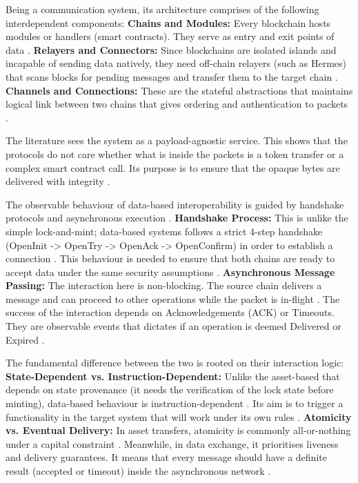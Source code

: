 Being a communication system, its architecture comprises of the
following interdependent components: \textbf{Chains and Modules:} Every
blockchain hosts modules or handlers (smart contracts). They serve as
entry and exit points of data \citep{Delgado_von_Eitzen_2025}
\citep{Chervinski_2023}. \textbf{Relayers and Connectors:} Since
blockchains are isolated islands and incapable of sending data natively,
they need off-chain relayers (such as Hermes) that scans blocks for
pending messages and transfer them to the target chain
\citep{Delgado_von_Eitzen_2025} \citep{Chervinski_2023}.
\textbf{Channels and Connections:} These are the stateful abstractions
that maintains logical link between two chains that gives ordering and
authentication to packets \citep{Bigiotti2025} \citep{wei2023formal}.

The literature sees the system as a payload-agnostic service. This shows
that the protocols do not care whether what is inside the packets is a
token transfer or a complex smart contract call. Its purpose is to
ensure that the opaque bytes are delivered with integrity
\citep{Kotey_2023} \citep{Delgado_von_Eitzen_2025}
\citep{Chervinski_2023} \citep{Bigiotti2025}.

The observable behaviour of data-based interoperability is guided by
handshake protocols and asynchronous execution \citep{lu2024atomicity}
\citep{Bigiotti2025} \citep{Wei_2023}. \textbf{Handshake Process:} This
is unlike the simple lock-and-mint; data-based systems follows a strict
4-step handshake (OpenInit -\textgreater{} OpenTry -\textgreater{}
OpenAck -\textgreater{} OpenConfirm) in order to establish a connection
\citep{Bigiotti2025} \citep{Wei_2023}. This behaviour is needed to
ensure that both chains are ready to accept data under the same security
assumptions \citep{Wei_2023}. \textbf{Asynchronous Message Passing:} The
interaction here is non-blocking. The source chain delivers a message
and can proceed to other operations while the packet is in-flight
\citep{lu2024atomicity} \citep{Bigiotti2025}. The success of the
interaction depends on Acknowledgements (ACK) or Timeouts. They are
observable events that dictates if an operation is deemed Delivered or
Expired \citep{Chervinski_2023} \citep{Wei_2023}.

The fundamental difference between the two is rooted on their
interaction logic: \textbf{State-Dependent vs. Instruction-Dependent:}
Unlike the asset-based that depends on state provenance (it needs the
verification of the lock state before minting), data-based behaviour is
instruction-dependent \citep{Wang_2022} \citep{deng2025}. Its aim is to
trigger a functionality in the target system that will work under its
own rules \citep{wang2021sok} \citep{Belchior_2021}. \textbf{Atomicity
vs. Eventual Delivery:} In asset transfers, atomicity is commonly
all-or-nothing under a capital constraint \citep{Pillai_2022}
\citep{Belchior_2023}. Meanwhile, in data exchange, it prioritises
liveness and delivery guarantees. It means that every message should
have a definite result (accepted or timeout) inside the asynchronous
network \citep{Bigiotti2025} \citep{Pillai_2022} \citep{Wei_2023}.

